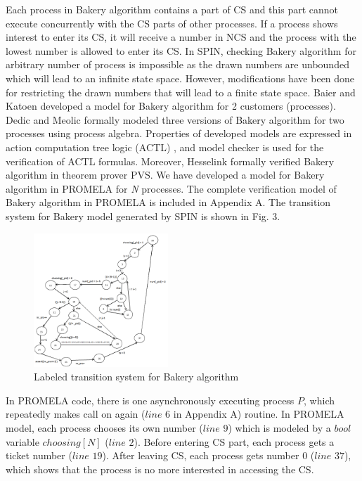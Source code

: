 \documentclass[conference]{IEEEtran}
\begin{document}
Each process in Bakery algorithm contains a part of CS and this part cannot execute concurrently with the CS parts of other processes. 
If a process shows interest to enter its CS, it will receive a number in NCS and the process with the lowest number is allowed to enter its CS. 
In SPIN, checking Bakery algorithm for arbitrary number of process is impossible as the drawn numbers are unbounded which will lead to an infinite 
state space. However, modifications have been done for restricting the drawn numbers that will lead to a finite state space. Baier and Katoen 
\cite{33} developed a model for Bakery algorithm for 2 customers (processes). Dedic and Meolic \cite{19} formally modeled three versions of Bakery
algorithm for two processes using process algebra. Properties of developed models are expressed in action computation tree logic (ACTL) \cite{21}, 
and model checker is used for the verification of ACTL formulas. Moreover, Hesselink \cite{34} formally verified Bakery algorithm in theorem prover 
PVS. We have developed a model for Bakery algorithm in PROMELA for \emph{N} processes. The complete verification model of Bakery algorithm in 
PROMELA is included in Appendix A. The transition system for Bakery model generated by SPIN is shown in Fig. 3.\vspace{-4mm}
\begin{figure}[!ht]
\centering\includegraphics[width=0.45\textwidth]{bakerymodel}
\caption{Labeled transition system for Bakery algorithm} 
\end{figure}

In PROMELA code, there is one asynchronously executing process $P$, which repeatedly makes call on again ($line$ $6$ in Appendix A) routine. 
In PROMELA model, each process chooses its own number ($line$ $9$) which is modeled by a $bool$ variable $choosing[N]$ ($line$ $2$). Before 
entering CS part,
each process gets a ticket number ($line$ $19$). After leaving CS, each process gets number 0 ($line$ $37$), which shows that the process is no more 
interested in accessing the CS.
\end{document}

